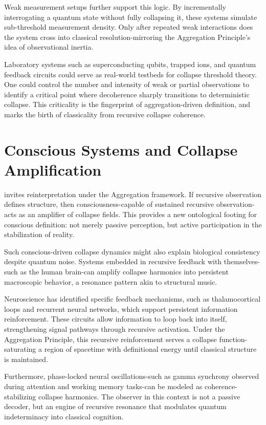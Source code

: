Weak measurement setups further support this logic. By incrementally interrogating a quantum state without fully collapsing it, these systems simulate sub-threshold measurement density. Only after repeated weak interactions does the system cross into classical resolution-mirroring the Aggregation Principle’s idea of observational inertia.

Laboratory systems such as superconducting qubits, trapped ions, and quantum feedback circuits could serve as real-world testbeds for collapse threshold theory. One could control the number and intensity of weak or partial observations to identify a critical point where decoherence sharply transitions to deterministic collapse. This criticality is the fingerprint of aggregation-driven definition, and marks the birth of classicality from recursive collapse coherence.

\section{Conscious Systems and Collapse Amplification}

\cite{aggregation_consciousness} invites reinterpretation under the Aggregation framework. If recursive observation defines structure, then consciousness-capable of sustained recursive observation-acts as an amplifier of collapse fields. This provides a new ontological footing for conscious definition: not merely passive perception, but active participation in the stabilization of reality.

Such conscious-driven collapse dynamics might also explain biological consistency despite quantum noise. Systems embedded in recursive feedback with themselves-such as the human brain-can amplify collapse harmonics into persistent macroscopic behavior, a resonance pattern akin to structural music.

Neuroscience has identified specific feedback mechanisms, such as thalamocortical loops and recurrent neural networks, which support persistent information reinforcement. These circuits allow information to loop back into itself, strengthening signal pathways through recursive activation. Under the Aggregation Principle, this recursive reinforcement serves a collapse function-saturating a region of spacetime with definitional energy until classical structure is maintained.

Furthermore, phase-locked neural oscillations-such as gamma synchrony observed during attention and working memory tasks-can be modeled as coherence-stabilizing collapse harmonics. The observer in this context is not a passive decoder, but an engine of recursive resonance that modulates quantum indeterminacy into classical cognition.

